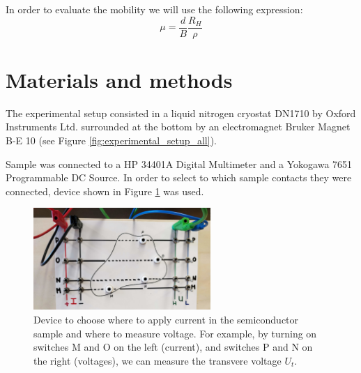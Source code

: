 \documentclass[11pt,a4paper]{article}
\begin{document}
In order to evaluate the mobility we will use the following expression:
\begin{equation}
\mu=\frac{d}{B}\frac{R_H}{\rho}
\end{equation}

\section{Materials and methods}

The experimental setup consisted in a liquid nitrogen cryostat DN1710 by Oxford Instruments Ltd. surrounded at the bottom by an electromagnet Bruker Magnet B-E 10 (see Figure \ref{fig:experimental_setup_all}).

Sample was connected to a HP 34401A Digital Multimeter and a Yokogawa 7651 Programmable DC Source. In order to select to which sample contacts they were connected, device shown in Figure \ref{fig:cables} was used.

\begin{figure}[H]
\centering
\includegraphics[width=0.6\textwidth]{Experimental_setup_cables}
\caption{Device to choose where to apply current in the semiconductor sample and where to measure voltage. For example, by turning on switches M and O on the left (current), and switches P and N on the right (voltages), we can measure the transvere voltage $U_t$.}
\label{fig:cables}
\end{figure}
\end{document}
